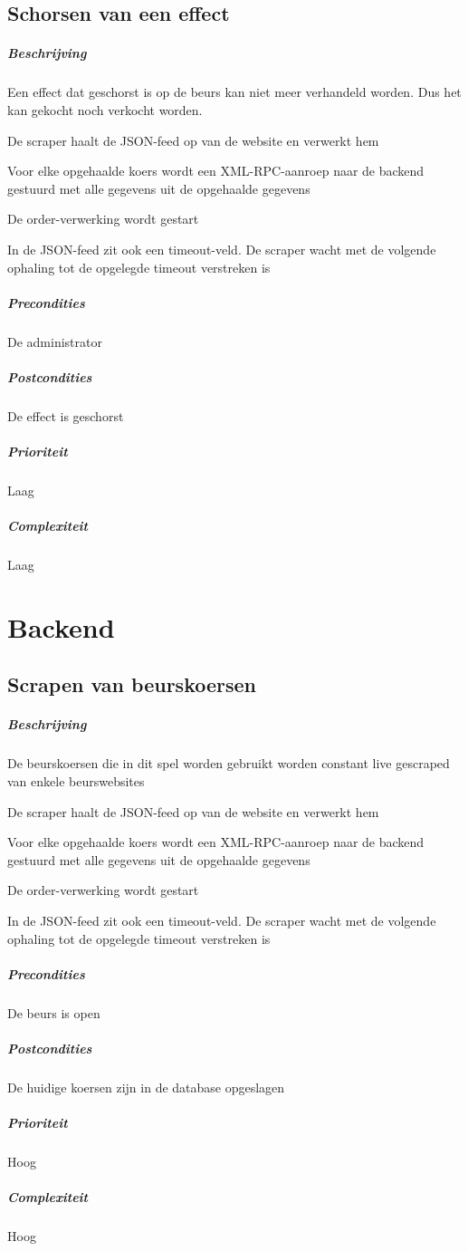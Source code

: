 \subsection{Schorsen van een effect}
\begin{compact}
\subparagraph{Beschrijving} Een effect dat geschorst is op de beurs kan niet meer verhandeld worden. Dus het kan gekocht noch verkocht worden.
\begin{itemize_compact}
	\item De scraper haalt de JSON-feed op van de website en verwerkt hem
  \item Voor elke opgehaalde koers wordt een XML-RPC-aanroep naar de backend gestuurd met alle gegevens uit de opgehaalde gegevens
  \item De order-verwerking wordt gestart
  \item In de JSON-feed zit ook een timeout-veld. De scraper wacht met de volgende ophaling tot de opgelegde timeout verstreken is
\end{itemize_compact}
\subparagraph{Precondities} De administrator 
\subparagraph{Postcondities} De effect is geschorst
\subparagraph{Prioriteit}Laag
\subparagraph{Complexiteit}Laag
\end{compact}


\section{Backend}

\subsection{Scrapen van beurskoersen}
\begin{compact}
\subparagraph{Beschrijving} De beurskoersen die in dit spel worden gebruikt worden constant live gescraped van enkele beurswebsites
\begin{itemize_compact}
	\item De scraper haalt de JSON-feed op van de website en verwerkt hem
  \item Voor elke opgehaalde koers wordt een XML-RPC-aanroep naar de backend gestuurd met alle gegevens uit de opgehaalde gegevens
  \item De order-verwerking wordt gestart
  \item In de JSON-feed zit ook een timeout-veld. De scraper wacht met de volgende ophaling tot de opgelegde timeout verstreken is
\end{itemize_compact}
\subparagraph{Precondities} De beurs is open
\subparagraph{Postcondities} De huidige koersen zijn in de database opgeslagen
\subparagraph{Prioriteit}Hoog
\subparagraph{Complexiteit}Hoog
\end{compact}

